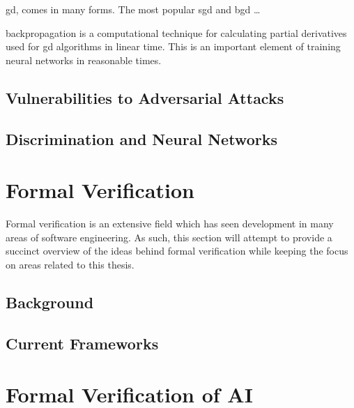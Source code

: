 \gls{gd}, comes in many forms. The most popular \Gls{sgd} and \Gls{bgd} \dots

backpropagation is a computational technique for calculating
partial derivatives used for \gls{gd} algorithms in linear time. This is an important
element of training neural networks in reasonable times.


\subsection{Vulnerabilities to Adversarial Attacks}

\subsection{Discrimination and Neural Networks}


\section{Formal Verification}

Formal verification is an extensive field which has seen development in many areas 
of software engineering. As such, this section will attempt to provide a succinct 
overview of the ideas behind formal verification while keeping the focus on areas
related to this thesis.

\subsection{Background}


\subsection{Current Frameworks}


\section{Formal Verification of AI}

